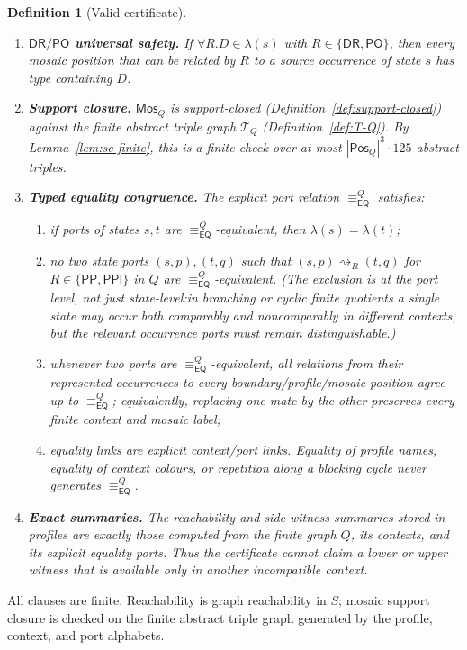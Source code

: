 \documentclass[11pt]{article}
\newtheorem{definition}[theorem]{Definition}
\newcommand{\EQ}{\mathsf{EQ}}
\newcommand{\DR}{\mathsf{DR}}
\newcommand{\PO}{\mathsf{PO}}
\newcommand{\PP}{\mathsf{PP}}
\newcommand{\PPI}{\mathsf{PPI}}
\newcommand{\Mos}{\mathsf{Mos}}
\newcommand{\reach}{\rightsquigarrow}
\newcommand{\eqc}{\equiv_{\EQ}}
\newcommand{\Pos}{\mathsf{Pos}}
\begin{document}
\begin{definition}[Valid certificate]
\begin{enumerate}[label=(V\arabic*)]
\item \textbf{$\DR/\PO$ universal safety.}  If $\forall R.D\in\lambda(s)$ with $R\in\{\DR,\PO\}$, then every mosaic position that can be related by $R$ to a source occurrence of state $s$ has type containing $D$.

\item \textbf{Support closure.}  $\Mos_Q$ is support-closed (Definition~\ref{def:support-closed}) against the finite abstract triple graph $\mathcal T_Q$ (Definition~\ref{def:T-Q}).  By Lemma~\ref{lem:sc-finite}, this is a finite check over at most $|\Pos_Q|^3\cdot 125$ abstract triples.

\item \textbf{Typed equality congruence.}  The explicit port relation $\eqc^{Q}$ satisfies:
  \begin{enumerate}[label=(E\alph*)]
  \item if ports of states $s,t$ are $\eqc^{Q}$-equivalent, then $\lambda(s)=\lambda(t)$;
  \item no two state ports $(s,p),(t,q)$ such that $(s,p)\reach_R(t,q)$ for $R\in\{\PP,\PPI\}$ in $Q$ are $\eqc^{Q}$-equivalent.  (The exclusion is at the port level, not just state-level:\@ in branching or cyclic finite quotients a single state may occur both comparably and noncomparably in different contexts, but the relevant occurrence ports must remain distinguishable.)
  \item whenever two ports are $\eqc^{Q}$-equivalent, all relations from their represented occurrences to every boundary/profile/mosaic position agree up to $\eqc^{Q}$; equivalently, replacing one mate by the other preserves every finite context and mosaic label;
  \item equality links are explicit context/port links.  Equality of profile names, equality of context colours, or repetition along a blocking cycle never generates $\eqc^{Q}$.
  \end{enumerate}

\item \textbf{Exact summaries.}  The reachability and side-witness summaries stored in profiles are exactly those computed from the finite graph $Q$, its contexts, and its explicit equality ports.  Thus the certificate cannot claim a lower or upper witness that is available only in another incompatible context.
\end{enumerate}
\end{definition}

All clauses are finite.  Reachability is graph reachability in $S$; mosaic support closure is checked on the finite abstract triple graph generated by the profile, context, and port alphabets.
\end{document}
